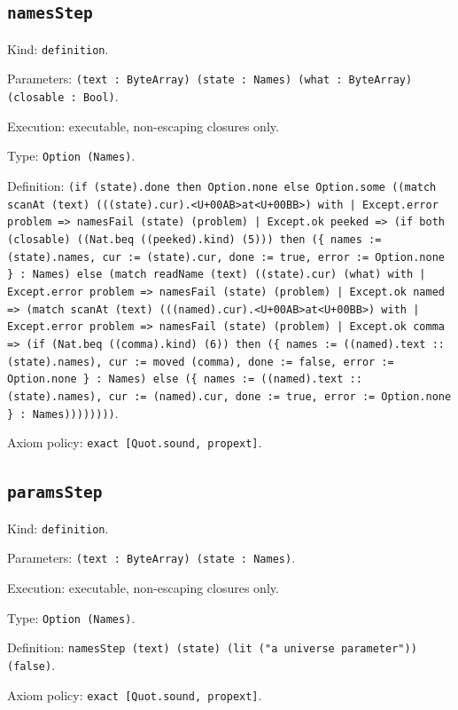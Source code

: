 \documentclass[11pt]{article}
\begin{document}
\subsection*{\texttt{namesStep}}
\noindent Kind: \texttt{definition}.\par
\noindent Parameters: \texttt{(text : ByteArray) (state : Names) (what : ByteArray) (closable : Bool)}.\par
\noindent Execution: executable, non-escaping closures only.\par
\noindent Type: \texttt{Option (Names)}.\par
\noindent Definition: \texttt{(if (state).done then Option.none else Option.some ((match scanAt (text) (((state).cur).<U+00AB>at<U+00BB>) with | Except.error problem => namesFail (state) (problem) | Except.ok peeked => (if both (closable) ((Nat.beq ((peeked).kind) (5))) then (\{ names := (state).names, cur := (state).cur, done := true, error := Option.none \} : Names) else (match readName (text) ((state).cur) (what) with | Except.error problem => namesFail (state) (problem) | Except.ok named => (match scanAt (text) (((named).cur).<U+00AB>at<U+00BB>) with | Except.error problem => namesFail (state) (problem) | Except.ok comma => (if (Nat.beq ((comma).kind) (6)) then (\{ names := ((named).text :: (state).names), cur := moved (comma), done := false, error := Option.none \} : Names) else (\{ names := ((named).text :: (state).names), cur := (named).cur, done := true, error := Option.none \} : Names))))))))}.\par
\noindent Axiom policy: \texttt{exact [Quot.sound, propext]}.\par
\subsection*{\texttt{paramsStep}}
\noindent Kind: \texttt{definition}.\par
\noindent Parameters: \texttt{(text : ByteArray) (state : Names)}.\par
\noindent Execution: executable, non-escaping closures only.\par
\noindent Type: \texttt{Option (Names)}.\par
\noindent Definition: \texttt{namesStep (text) (state) (lit ("a universe parameter")) (false)}.\par
\noindent Axiom policy: \texttt{exact [Quot.sound, propext]}.\par
\end{document}
